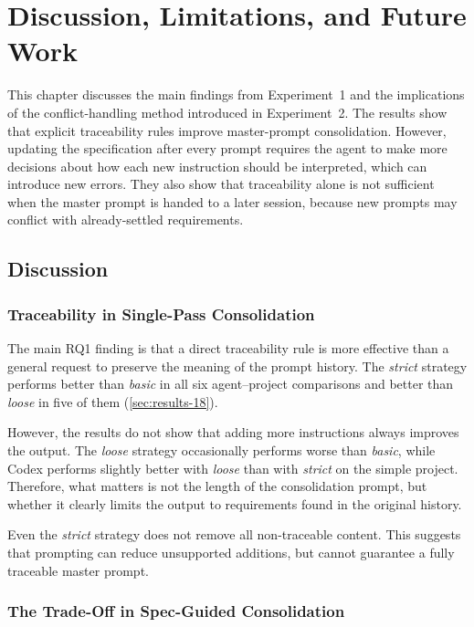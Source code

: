 \chapter{Discussion, Limitations, and Future Work}
\label{chap:discussion}

This chapter discusses the main findings from Experiment~1 and the
implications of the conflict-handling method introduced in Experiment~2. The results
show that explicit traceability rules improve master-prompt consolidation.
However, updating the specification after every prompt requires the agent to
make more decisions about how each new instruction should be interpreted,
which can introduce new errors. They also show that traceability alone is not sufficient when the
master prompt is handed to a later session, because new prompts may conflict
with already-settled requirements.

\section{Discussion}

\subsection{Traceability in Single-Pass Consolidation}

The main RQ1 finding is that a direct traceability rule is more effective than
a general request to preserve the meaning of the prompt history. The
\emph{strict} strategy performs better than \emph{basic} in all six
agent--project comparisons and better than \emph{loose} in five of them
(\cref{sec:results-18}).

However, the results do not show that adding more instructions always improves
the output. The \emph{loose} strategy occasionally performs worse than
\emph{basic}, while Codex performs slightly better with \emph{loose} than
with \emph{strict} on the simple project. Therefore, what matters is not the
length of the consolidation prompt, but whether it clearly limits the output
to requirements found in the original history.

Even the \emph{strict} strategy does not remove all non-traceable content.
This suggests that prompting can reduce unsupported additions, but cannot
guarantee a fully traceable master prompt.

\subsection{The Trade-Off in Spec-Guided Consolidation}
\label{sec:discussion-tradeoff}

